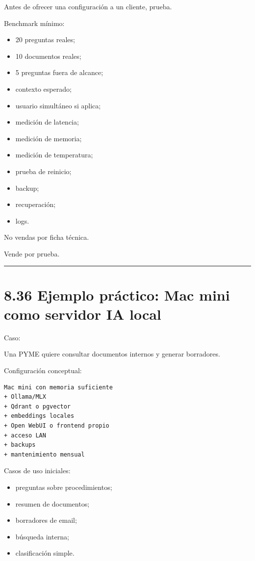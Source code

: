 Antes de ofrecer una configuración a un cliente, prueba.

Benchmark mínimo:

\begin{itemize}
\tightlist
\item
  20 preguntas reales;
\item
  10 documentos reales;
\item
  5 preguntas fuera de alcance;
\item
  contexto esperado;
\item
  usuario simultáneo si aplica;
\item
  medición de latencia;
\item
  medición de memoria;
\item
  medición de temperatura;
\item
  prueba de reinicio;
\item
  backup;
\item
  recuperación;
\item
  logs.
\end{itemize}

No vendas por ficha técnica.

Vende por prueba.

\begin{center}\rule{0.5\linewidth}{0.5pt}\end{center}

\section{8.36 Ejemplo práctico: Mac mini como servidor IA
local}\label{ejemplo-pruxe1ctico-mac-mini-como-servidor-ia-local}

Caso:

Una PYME quiere consultar documentos internos y generar borradores.

Configuración conceptual:

\begin{lstlisting}
Mac mini con memoria suficiente
+ Ollama/MLX
+ Qdrant o pgvector
+ embeddings locales
+ Open WebUI o frontend propio
+ acceso LAN
+ backups
+ mantenimiento mensual
\end{lstlisting}

Casos de uso iniciales:

\begin{itemize}
\tightlist
\item
  preguntas sobre procedimientos;
\item
  resumen de documentos;
\item
  borradores de email;
\item
  búsqueda interna;
\item
  clasificación simple.
\end{itemize}

